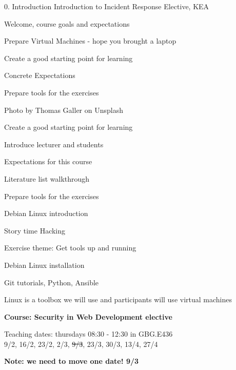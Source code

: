 \documentclass[Screen16to9,17pt]{foils}
\begin{document}
\mytitlepage
{0. Introduction}
{Introduction to Incident Response Elective, KEA}


\hlkprofiluk



\begin{list2}
\item Welcome, course goals and expectations
\item Prepare Virtual Machines - hope you brought a laptop
\item Create a good starting point for learning
\item Concrete Expectations
\item Prepare tools for the exercises
\end{list2}

Photo by Thomas Galler on Unsplash


\begin{list2}
\item Create a good starting point for learning
\item Introduce lecturer and students
\item Expectations for this course
\item Literature list walkthrough
\item Prepare tools for the exercises
\item Debian Linux introduction
\item Story time Hacking
\end{list2}

Exercise theme: Get tools up and running
\begin{list2}
\item Debian Linux installation
\item Git tutorials, Python, Ansible
\end{list2}
Linux is a toolbox we will use and participants will use virtual machines




{\Large\bf Course: Security in Web Development elective}

Teaching dates: thursdays 08:30 - 12:30 in GBG.E436\\
9/2, 16/2, 23/2, 2/3, \sout{9/3}, 23/3, 30/3, 13/4, 27/4

{\bf Note: we need to move one date! 9/3}
\end{document}
